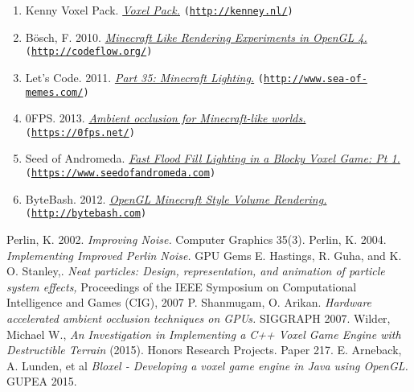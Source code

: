\documentclass{book}
\begin{document}
\begin{enumerate}
	\item Kenny Voxel Pack. {\em \href{http://kenney.nl/assets/voxel-pack}{Voxel Pack.}} \texttt{(\url{http://kenney.nl/})}
	\item Bösch, F. 2010. {\em \href{http://codeflow.org/entries/2010/dec/09/minecraft-like-rendering-experiments-in-opengl-4/#ambient-occlusion}{Minecraft Like Rendering Experiments in OpenGL 4.}} \texttt{(\url{http://codeflow.org/})}
	\item Let's Code. 2011. {\em \href{http://www.sea-of-memes.com/LetsCode35/LetsCode35.html}{Part 35: Minecraft Lighting.}} \texttt{(\url{http://www.sea-of-memes.com/})}
	\item 0FPS. 2013. {\em \href{https://0fps.net/2013/07/03/ambient-occlusion-for-minecraft-like-worlds/}{Ambient occlusion for Minecraft-like worlds.}} \texttt{(\url{https://0fps.net/})}
	\item Seed of Andromeda. {\em \href{https://www.seedofandromeda.com/blogs/29-fast-flood-fill-lighting-in-a-blocky-voxel-game-pt-1/}{Fast Flood Fill Lighting in a Blocky Voxel Game: Pt 1.}} \texttt{(\url{https://www.seedofandromeda.com})}
	\item ByteBash. 2012. {\em \href{http://bytebash.com/2012/03/opengl-volume-rendering/}{OpenGL Minecraft Style Volume Rendering.}} \texttt{(\url{http://bytebash.com})}
\end{enumerate}


\nocite{*}
\begin{thebibliography}{1}
	    
	 Perlin, K. 2002. {\em Improving Noise.} Computer Graphics 35(3).
	  Perlin, K. 2004. {\em Implementing Improved Perlin Noise.} GPU Gems
	  E. Hastings, R. Guha, and K. O. Stanley,. {\em Neat particles: Design, representation, and animation of particle system effects,} Proceedings of the IEEE Symposium on Computational Intelligence and Games (CIG), 2007
	 P. Shanmugam, O. Arikan. {\em Hardware accelerated ambient occlusion techniques on GPUs. }  SIGGRAPH 2007.
	  Wilder, Michael W., {\em An Investigation in Implementing a C++ Voxel Game Engine with Destructible Terrain } (2015). Honors Research Projects. Paper 217.
	 E. Arneback, A. Lunden, et al {\em Bloxel - Developing a voxel game engine in Java using OpenGL. } GUPEA 2015.
\end{thebibliography}

\clearpage
\end{document}
